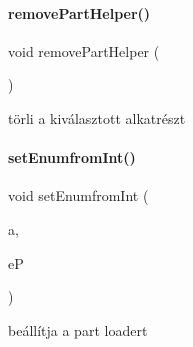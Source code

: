 \mbox{\label{_menu_8h_af332548b8c7c1e4d477c95abf6233b5d}} 
\paragraph{\texorpdfstring{removePartHelper()}{removePartHelper()}}
{\footnotesize\ttfamily void remove\+Part\+Helper (\begin{DoxyParamCaption}\item[{\mbox{\hyperlink{class_inventory}{Inventory}} \&}]{ }\end{DoxyParamCaption})}



törli a kiválasztott alkatrészt 

\mbox{\label{_menu_8h_a4b1c8fae94d189d0d74b10cde7b75176}} 
\paragraph{\texorpdfstring{setEnumfromInt()}{setEnumfromInt()}}
{\footnotesize\ttfamily void set\+Enumfrom\+Int (\begin{DoxyParamCaption}\item[{int}]{a,  }\item[{\mbox{\hyperlink{_parts_8h_abddff37837f171d72a2e16a1448a3943}{enum\+Part}} \&}]{eP }\end{DoxyParamCaption})}



beállítja a part loadert 

